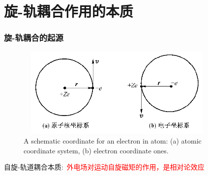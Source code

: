 \small
%
\section{旋-轨耦合作用的本质}
\frame
{
\frametitle{旋-轨耦合的起源}
\begin{figure}[h!]
\centering
\includegraphics[height=1.75in,width=3.95in,viewport=0 0 600 270,clip]{Figures/SOC_cor.png}
\caption{\tiny \textrm{A schematic coordinate for an electron in atom: (a) atomic coordinate system, (b) electron coordinate ones.}}%
\label{Nuclear_Electron}
\end{figure}
自旋-轨道耦合本质:~\textcolor{red}{外电场对运动自旋磁矩的作用，是相对论效应}
}

